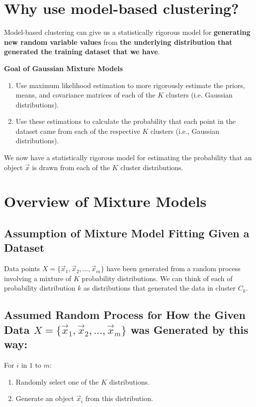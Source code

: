 \documentclass[11pt]{elegantbook}
\begin{document}
\section{Why use model-based clustering?}
Model-based clustering can give us a statistically rigorous model for \textbf{generating new random variable values} from \textbf{the underlying distribution that generated the training dataset that we have}.

\textbf{Goal of Gaussian Mixture Models}
\begin{enumerate}[$\bullet$]
    \item Use maximum likelihood estimation to more rigorously estimate the priors, means, and covariance matrices of each of the $K$ clusters (i.e. Gaussian distributions).
    \item Use these estimations to calculate the probability that each point in the dataset came from each of the respective $K$ clusters (i.e., Gaussian distributions).
\end{enumerate}
We now have a statistically rigorous model for estimating the probability that an object $\vec{x}$ is drawn from each of the $K$ cluster distributions.

\section{Overview of Mixture Models}
\subsection*{Assumption of Mixture Model Fitting Given a Dataset}
Data points $X=\{\vec{x}_1,\vec{x}_2,...,\vec{x}_m\}$ have been generated from a random process involving a mixture of $K$ probability distributions. We can think of each of probability distribution $k$ as distributions that generated the data in cluster $C_k$.

\subsection*{Assumed Random Process for How the Given Data $X=\{\vec{x}_1,\vec{x}_2,...,\vec{x}_m\}$ was Generated by this way:}

For $i$ in $1$ to $m$:
\begin{enumerate}[1.]
    \item Randomly select one of the $K$ distributions.
    \item Generate an object $\vec{x}_i$ from this distribution.
\end{enumerate}
\end{document}
